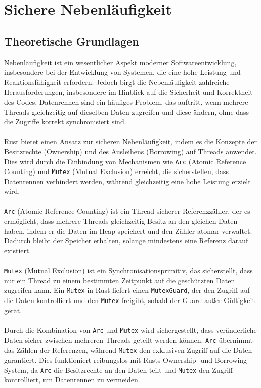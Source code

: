 \chapter{Sichere Nebenläufigkeit}

\section{Theoretische Grundlagen}

Nebenläufigkeit ist ein wesentlicher Aspekt moderner Softwareentwicklung, insbesondere bei der Entwicklung von Systemen, die eine hohe Leistung und Reaktionsfähigkeit erfordern. 
Jedoch birgt die Nebenläufigkeit zahlreiche Herausforderungen, insbesondere im Hinblick auf die Sicherheit und Korrektheit des Codes.
Datenrennen sind ein häufiges Problem, das auftritt, wenn mehrere Threads gleichzeitig auf dieselben Daten zugreifen und diese ändern, ohne dass die Zugriffe korrekt synchronisiert sind.\\ 
\\
Rust bietet einen Ansatz zur sicheren Nebenläufigkeit, indem es die Konzepte der Besitzrechte (Ownership) und des Ausleihens (Borrowing) auf Threads anwendet. 
Dies wird durch die Einbindung von Mechanismen wie \texttt{Arc} (Atomic Reference Counting) und \texttt{Mutex} (Mutual Exclusion) erreicht, die sicherstellen, dass Datenrennen verhindert werden, während gleichzeitig eine hohe Leistung erzielt wird.\\
\\
\texttt{Arc} (Atomic Reference Counting) ist ein Thread-sicherer Referenzzähler, der es ermöglicht, dass mehrere Threads gleichzeitig Besitz an den gleichen Daten haben, indem er die Daten im Heap speichert und den Zähler atomar verwaltet. 
Dadurch bleibt der Speicher erhalten, solange mindestens eine Referenz darauf existiert.\\
\\
\texttt{Mutex} (Mutual Exclusion) ist ein Synchronisationsprimitiv, das sicherstellt, dass nur ein Thread zu einem bestimmten Zeitpunkt auf die geschützten Daten zugreifen kann. 
Ein \texttt{Mutex} in Rust liefert einen \texttt{MutexGuard}, der den Zugriff auf die Daten kontrolliert und den \texttt{Mutex} freigibt, sobald der Guard außer Gültigkeit gerät.\\
\\
Durch die Kombination von \texttt{Arc} und \texttt{Mutex} wird sichergestellt, dass veränderliche Daten sicher zwischen mehreren Threads geteilt werden können. 
\texttt{Arc} übernimmt das Zählen der Referenzen, während \texttt{Mutex} den exklusiven Zugriff auf die Daten garantiert. 
Dies funktioniert reibungslos mit Rusts Ownership- und Borrowing-System, da \texttt{Arc} die Besitzrechte an den Daten teilt und \texttt{Mutex} den Zugriff kontrolliert, um Datenrennen zu vermeiden. 


